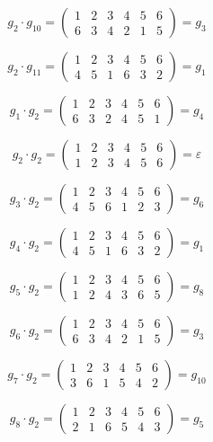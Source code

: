 \documentclass[utf8,14pt,a4paper,oneside,russian]{book}
\begin{document}
	\[ g_{2}\cdot g_{10} = \left( 
	\begin{array}{cccccc}
	1&2&3&4&5&6\\
	6&3&4&2&1&5
	\end{array} 
	\right) = g_{3} \]
	
	\[ g_{2}\cdot g_{11} = \left( 
	\begin{array}{cccccc}
	1&2&3&4&5&6\\
	4&5&1&6&3&2
	\end{array} 
	\right) = g_{1} \]
	
	\[ g_{1}\cdot g_{2} = \left( 
	\begin{array}{cccccc}
	1&2&3&4&5&6\\
	6&3&2&4&5&1
	\end{array} 
	\right) = g_{4} \]
	
	\[ g_{2}\cdot g_{2} = \left( 
	\begin{array}{cccccc}
	1&2&3&4&5&6\\
	1&2&3&4&5&6
	\end{array} 
	\right) = \varepsilon \]
	
	\[ g_{3}\cdot g_{2} = \left( 
	\begin{array}{cccccc}
	1&2&3&4&5&6\\
	4&5&6&1&2&3
	\end{array} 
	\right) = g_{6} \]
	
	\[ g_{4}\cdot g_{2} = \left( 
	\begin{array}{cccccc}
	1&2&3&4&5&6\\
	4&5&1&6&3&2
	\end{array} 
	\right) = g_{1} \]
	
	\[ g_{5}\cdot g_{2} = \left( 
	\begin{array}{cccccc}
	1&2&3&4&5&6\\
	1&2&4&3&6&5
	\end{array} 
	\right) = g_{8} \]
	
	\[ g_{6}\cdot g_{2} = \left( 
	\begin{array}{cccccc}
	1&2&3&4&5&6\\
	6&3&4&2&1&5
	\end{array} 
	\right) = g_{3} \]
	
	\[ g_{7}\cdot g_{2} = \left( 
	\begin{array}{cccccc}
	1&2&3&4&5&6\\
	3&6&1&5&4&2
	\end{array} 
	\right) = g_{10} \]
	
	\[ g_{8}\cdot g_{2} = \left( 
	\begin{array}{cccccc}
	1&2&3&4&5&6\\
	2&1&6&5&4&3
	\end{array} 
	\right) = g_{5} \]
	
\end{document}
